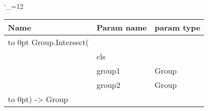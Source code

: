 \begingroup \catcode`\_=12 \tt
\begin{tabular}{lll}
\toprule
\textrm{Name}&\textrm{Param name}&\textrm{param type}\\
\midrule
\hbox to 0pt {Group.Intersect(\hss}\\
& cls\\
& group1 & Group\\
& group2 & Group\\
\hbox to 0pt{) -> Group\hss}\\
\bottomrule
\end{tabular}
\endgroup
